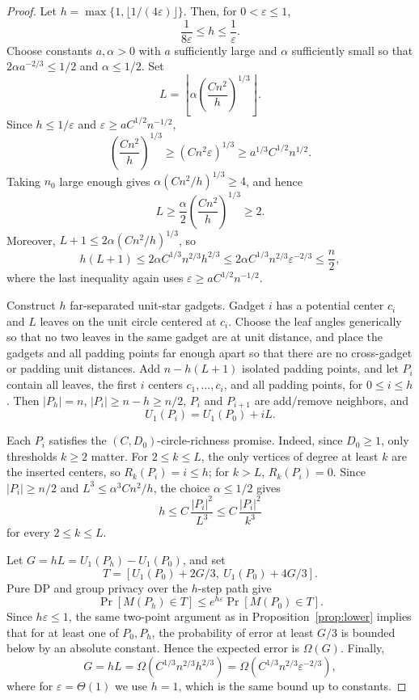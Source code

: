 \documentclass[11pt]{article}
\newcommand{\eps}{\varepsilon}
\begin{document}
\begin{proof}
Let \(h=\max\{1,\lfloor 1/(4\eps)\rfloor\}\). Then, for \(0<\eps\le1\),
\[
\frac{1}{8\eps}\le h\le \frac{1}{\eps}.
\]
Choose constants \(a,\alpha>0\) with \(a\) sufficiently large and \(\alpha\) sufficiently small so that \(2\alpha a^{-2/3}\le 1/2\) and \(\alpha\le1/2\). Set
\[
L=\left\lfloor \alpha\left(\frac{C n^2}{h}\right)^{1/3}\right\rfloor.
\]
Since \(h\le1/\eps\) and \(\eps\ge aC^{1/2}n^{-1/2}\),
\[
\left(\frac{C n^2}{h}\right)^{1/3}\ge (C n^2\eps)^{1/3}
\ge a^{1/3}C^{1/2}n^{1/2}.
\]
Taking \(n_0\) large enough gives \(\alpha(Cn^2/h)^{1/3}\ge4\), and hence
\[
L\ge \frac{\alpha}{2}\left(\frac{C n^2}{h}\right)^{1/3}\ge2.
\]
Moreover, \(L+1\le2\alpha(Cn^2/h)^{1/3}\), so
\[
h(L+1)\le 2\alpha C^{1/3}n^{2/3}h^{2/3}
\le 2\alpha C^{1/3}n^{2/3}\eps^{-2/3}
\le \frac{n}{2},
\]
where the last inequality again uses \(\eps\ge aC^{1/2}n^{-1/2}\).

Construct \(h\) far-separated unit-star gadgets. Gadget \(i\) has a potential center \(c_i\) and \(L\) leaves on the unit circle centered at \(c_i\). Choose the leaf angles generically so that no two leaves in the same gadget are at unit distance, and place the gadgets and all padding points far enough apart so that there are no cross-gadget or padding unit distances. Add \(n-h(L+1)\) isolated padding points, and let \(P_i\) contain all leaves, the first \(i\) centers \(c_1,\ldots,c_i\), and all padding points, for \(0\le i\le h\). Then \(|P_h|=n\), \(|P_i|\ge n-h\ge n/2\), \(P_i\) and \(P_{i+1}\) are add/remove neighbors, and
\[
U_1(P_i)=U_1(P_0)+iL.
\]

Each \(P_i\) satisfies the \((C,D_0)\)-circle-richness promise. Indeed, since \(D_0\ge1\), only thresholds \(k\ge2\) matter. For \(2\le k\le L\), the only vertices of degree at least \(k\) are the inserted centers, so \(R_k(P_i)=i\le h\); for \(k>L\), \(R_k(P_i)=0\). Since \(|P_i|\ge n/2\) and \(L^3\le \alpha^3 Cn^2/h\), the choice \(\alpha\le1/2\) gives
\[
h\le C\,\frac{|P_i|^2}{L^3}\le C\,\frac{|P_i|^2}{k^3}
\]
for every \(2\le k\le L\).

Let \(G=hL=U_1(P_h)-U_1(P_0)\), and set
\[
T=[U_1(P_0)+2G/3,\ U_1(P_0)+4G/3].
\]
Pure DP and group privacy over the \(h\)-step path give
\[
\Pr[M(P_h)\in T]\le e^{h\eps}\Pr[M(P_0)\in T].
\]
Since \(h\eps\le1\), the same two-point argument as in Proposition~\ref{prop:lower} implies that for at least one of \(P_0,P_h\), the probability of error at least \(G/3\) is bounded below by an absolute constant. Hence the expected error is \(\Omega(G)\). Finally,
\[
G=hL=\Omega\!\left(C^{1/3}n^{2/3}h^{2/3}\right)
=\Omega\!\left(C^{1/3}n^{2/3}\eps^{-2/3}\right),
\]
where for \(\eps=\Theta(1)\) we use \(h=1\), which is the same bound up to constants.
\end{proof}
\end{document}
